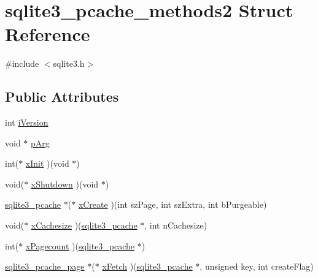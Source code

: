 \hypertarget{structsqlite3__pcache__methods2}{}\section{sqlite3\+\_\+pcache\+\_\+methods2 Struct Reference}
\label{structsqlite3__pcache__methods2}


{\ttfamily \#include $<$sqlite3.\+h$>$}

\subsection*{Public Attributes}
\begin{DoxyCompactItemize}
\item 
int \mbox{\hyperlink{structsqlite3__pcache__methods2_a03b27be6c7cb8f1d2662c454cbe58483}{i\+Version}}
\item 
void $\ast$ \mbox{\hyperlink{structsqlite3__pcache__methods2_aee83131f16bb88218d7b0339854719d6}{p\+Arg}}
\item 
int($\ast$ \mbox{\hyperlink{structsqlite3__pcache__methods2_a21f7fdd82d029d3b0567c573c012adfc}{x\+Init}} )(void $\ast$)
\item 
void($\ast$ \mbox{\hyperlink{structsqlite3__pcache__methods2_a4285fc03adf01cbd3283644a1072ffef}{x\+Shutdown}} )(void $\ast$)
\item 
\mbox{\hyperlink{sqlite3_8h_a096c453d937d51f7926d7d31c8e0bd2f}{sqlite3\+\_\+pcache}} $\ast$($\ast$ \mbox{\hyperlink{structsqlite3__pcache__methods2_aa8babc280d7ba89c6c279301d5a36d69}{x\+Create}} )(int sz\+Page, int sz\+Extra, int b\+Purgeable)
\item 
void($\ast$ \mbox{\hyperlink{structsqlite3__pcache__methods2_a76de689adc20fdbfef427b1c7ae1bcea}{x\+Cachesize}} )(\mbox{\hyperlink{sqlite3_8h_a096c453d937d51f7926d7d31c8e0bd2f}{sqlite3\+\_\+pcache}} $\ast$, int n\+Cachesize)
\item 
int($\ast$ \mbox{\hyperlink{structsqlite3__pcache__methods2_a16b85f7889b050702c739eccf2f0c036}{x\+Pagecount}} )(\mbox{\hyperlink{sqlite3_8h_a096c453d937d51f7926d7d31c8e0bd2f}{sqlite3\+\_\+pcache}} $\ast$)
\item 
\mbox{\hyperlink{structsqlite3__pcache__page}{sqlite3\+\_\+pcache\+\_\+page}} $\ast$($\ast$ \mbox{\hyperlink{structsqlite3__pcache__methods2_a6283d91a6ad5037fad33003c2198c9f7}{x\+Fetch}} )(\mbox{\hyperlink{sqlite3_8h_a096c453d937d51f7926d7d31c8e0bd2f}{sqlite3\+\_\+pcache}} $\ast$, unsigned key, int create\+Flag)
\item 

\end{DoxyCompactItemize}
